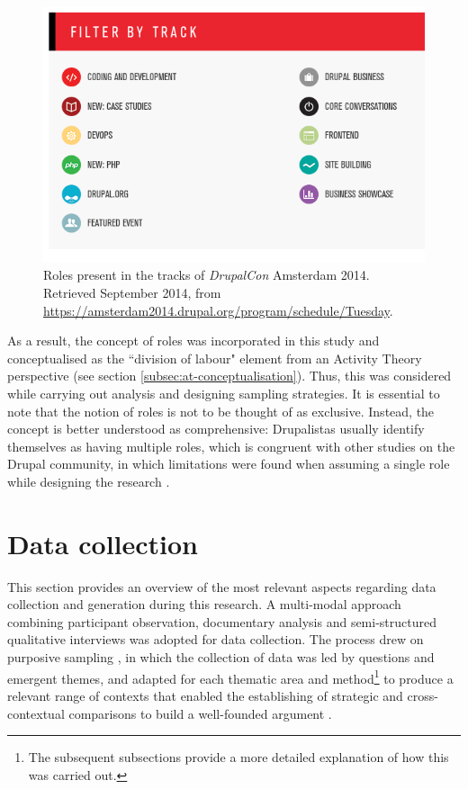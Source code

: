 \begin{figure}[H]
	\centering
	\includegraphics[scale=0.4]{img/drupal-roles-tracks-dcon14.png}
	\caption[Tracks at \textit{DrupalCon} Amsterdam 2014]%
    {Roles present in the tracks of \textit{DrupalCon} Amsterdam 2014. Retrieved  September 2014, from \url{https://amsterdam2014.drupal.org/program/schedule/Tuesday}.}
	\label{drupal-roles-tracks-dcon14}
\end{figure}

As a result, the concept of roles was incorporated in this study and conceptualised as the ``division of labour" element from an Activity Theory perspective (see section \ref{subsec:at-conceptualisation}). Thus, this was considered while carrying out analysis and designing sampling strategies. It is essential to note that the notion of roles is not to be thought of as exclusive. Instead, the concept is better understood as comprehensive: Drupalistas usually identify themselves as having multiple roles, which is congruent with other studies on the Drupal community, in which limitations were found when assuming a single role while designing the research \parencite{nordin2013development}.

\section{Data collection}
\label{sec:data-collection}

This section provides an overview of the most relevant aspects regarding data collection and generation during this research. A multi-modal approach combining participant observation, documentary analysis and semi-structured qualitative interviews was adopted for data collection. The process drew on purposive sampling \parencite{palys2008purposive}, in which the collection of data was led by questions and emergent themes, and adapted for each thematic area and method\footnote{The subsequent subsections provide a more detailed explanation of how this was carried out.} to produce a relevant range of contexts that enabled the establishing of strategic and cross-contextual comparisons to build a well-founded argument \parencite[123-127]{mason2002qualitative}.

